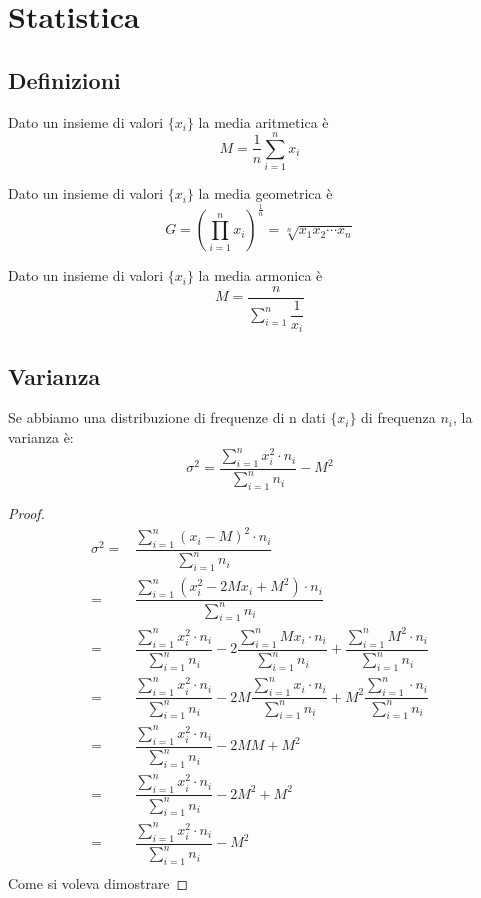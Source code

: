 \chapter{Statistica}
\section{Definizioni}
\begin{defn}\label{defn:mediaritmetica}
	Dato un insieme di valori $\lbrace x_i \rbrace$ la media aritmetica è\[M=\dfrac{1}{n}\sum_{i=1}^{n}x_{i}\]
\end{defn}
\begin{defn}\label{defn:mediageometrica}
	Dato un insieme di valori $\lbrace x_i \rbrace$ la media geometrica è\[G=\left(\prod _{i=1}^{n}x_{i}\right)^{\frac {1}{n}}={\sqrt[{n}]{x_{1}x_{2}\cdots x_{n}}}\]
\end{defn}
\begin{defn}\label{defn:mediarmonica}
	Dato un insieme di valori $\lbrace x_i \rbrace$ la media armonica è\[M=\dfrac{n}{\sum_{i=1}^{n}\dfrac{1}{x_{i}}}\]
\end{defn}
\section{Varianza}
\begin{thm}[Varianza]
	Se abbiamo una distribuzione di frequenze di n dati  $\lbrace x_i \rbrace$ di frequenza $n_{i}$, la varianza è: \[\sigma^{2}=\dfrac{\sum_{i=1}^{n}x_{i}^{2}\cdot n_{i}}{\sum_{i=1}^{n} n_{i}}-M^2\] 
\end{thm}
\begin{proof}
	\begin{align*}
	\sigma^{2}=&\dfrac{\sum_{i=1}^{n}(x_{i}-M)^{2}\cdot n_{i}}{\sum_{i=1}^{n} n_{i}}\\
	=&\dfrac{\sum_{i=1}^{n}(x_{i}^{2} -2Mx_{i}+M^{2})\cdot n_{i}}{\sum_{i=1}^{n} n_{i}}\\
	=&\dfrac{\sum_{i=1}^{n}x_{i}^{2}\cdot n_{i}}{\sum_{i=1}^{n} n_{i}}-2 \dfrac{\sum_{i=1}^{n}Mx_{i}\cdot n_{i}}{\sum_{i=1}^{n} n_{i}} +\dfrac{\sum_{i=1}^{n}M^{2}\cdot n_{i}}{\sum_{i=1}^{n} n_{i}}\\
	=&\dfrac{\sum_{i=1}^{n}x_{i}^{2}\cdot n_{i}}{\sum_{i=1}^{n} n_{i}}-2M \dfrac{\sum_{i=1}^{n}x_{i}\cdot n_{i}}{\sum_{i=1}^{n} n_{i}} +M^{2}\dfrac{\sum_{i=1}^{n}\cdot n_{i}}{\sum_{i=1}^{n} n_{i}}\\
	=&\dfrac{\sum_{i=1}^{n}x_{i}^{2}\cdot n_{i}}{\sum_{i=1}^{n} n_{i}}-2MM +M^{2}\\
	=&\dfrac{\sum_{i=1}^{n}x_{i}^{2}\cdot n_{i}}{\sum_{i=1}^{n} n_{i}}-2M^{2} +M^{2}\\
	=&\dfrac{\sum_{i=1}^{n}x_{i}^{2}\cdot n_{i}}{\sum_{i=1}^{n} n_{i}}-M^{2}\\
	\end{align*}
	Come si voleva dimostrare
\end{proof}
